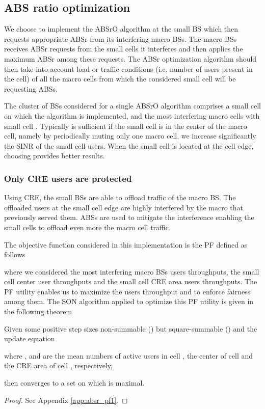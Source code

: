 \documentclass[conference]{IEEEtran}
\begin{document}
\subsection{ABS ratio optimization}
	We choose to implement the \ac{ABSrO} algorithm at the small \ac{BS} which then requests appropriate \ac{ABSr} from its interfering macro \acp{BS}. The macro \acp{BS} receives \ac{ABSr} requests from the small cells it interferes and then applies the maximum \ac{ABSr} among these requests. The \ac{ABSr} optimization algorithm should then take into account load or traffic conditions (i.e. number of users present in the cell) of all the macro cells from which the considered small cell will be requesting \acp{ABS}.
	
	The cluster of \acp{BS} considered for a single \ac{ABSrO} algorithm comprises a small cell  on which the algorithm is implemented, and the most interfering  macro cells with small cell . Typically  is sufficient if the small cell is in the center of the macro cell, namely by periodically muting only one macro cell, we increase significantly the \ac{SINR} of the small cell users. When the small cell is located at the cell edge, choosing  provides better results.

\subsubsection{Only \ac{CRE} users are protected} \label{protected_case_son}
	Using \ac{CRE}, the small \acp{BS} are able to offload traffic of the macro \ac{BS}. The offloaded users at the small cell edge are highly interfered by the macro that previously served them. \acp{ABS} are used to mitigate the interference enabling the small cells to offload even more the macro cell traffic.	
	
	The objective function considered in this implementation is the \ac{PF} defined as follows
	
	where we considered the  most interfering macro \acp{BS} users throughputs, the small cell center user throughputs and the small cell \ac{CRE} area users throughputs.
	The \ac{PF} utility enables us to maximize the users throughput and to enforce fairness among them. The \ac{SON} algorithm applied to optimize this PF utility is given in the following theorem
	
\begin{theorem} \label{th:absr_pf1}
	Given some positive step sizes  non-summable () but square-summable () and the update equation
	
	where ,  and  are the mean numbers of active users in cell , the center of cell  and the \ac{CRE} area of cell , respectively,
	
then  converges to a set on which  is maximal.
\end{theorem}
\begin{proof}
	See Appendix \ref{app:absr_pf1}.
\end{proof}
	
\end{document}
